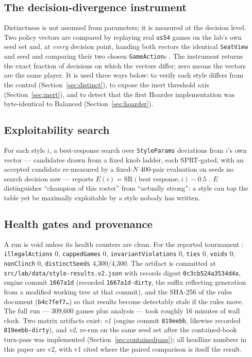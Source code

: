 \documentclass[11pt]{article}
\newcommand{\code}[1]{\texttt{#1}}
\newcommand{\usff}{\code{us54}}
\begin{document}
\subsection{The decision-divergence instrument}
\label{sec:instrument}

Distinctness is not assumed from parameters; it is measured at the decision level. Two policy
vectors are compared by replaying real \usff{} games on the lab's own seed set and, at
\emph{every} decision point, handing both vectors the identical \code{SeatView} and seed and
comparing their two chosen \code{GameAction}s \cite{styles}. The instrument returns the exact
fraction of decisions on which the vectors differ; zero means the vectors are the same player.
It is used three ways below: to verify each style differs from the control
(Section~\ref{sec:distinct}), to expose the inert threshold axis (Section~\ref{sec:inert}),
and to detect that the first Hoarder implementation was byte-identical to Balanced
(Section~\ref{sec:hoarder}).

\subsection{Exploitability search}

For each style $i$, a best-response search over \code{StyleParams} deviations from $i$'s own
vector --- candidates drawn from a fixed knob ladder, each SPRT-gated, with an accepted
candidate re-measured by a fixed-$N$ 400-pair evaluation on seeds no search decision saw ---
reports $E(i) = \mathrm{SR}(\text{best response}, i) - 0.5$ \cite{botlab,styles}. $E$
distinguishes ``champion of this roster'' from ``actually strong'': a style can top the table
yet be maximally exploitable by a style nobody has written.

\subsection{Health gates and provenance}
\label{sec:provenance}

A run is void unless its health counters are clean. For the reported tournament
\cite{artifact}: \code{illegalActions} 0, \code{cappedGames} 0, \code{invariantViolations} 0,
\code{ties} 0, \code{voids} 0, \code{nonClinch} 0, \code{distinctSeeds} 4{,}300/4{,}300. The
artifact is committed at \code{src/lab/data/style-results.v2.json} with records digest
\code{0c3cb524a3534d4a}, engine commit \code{1667a1d} (recorded \code{1667a1d-dirty}, the
suffix reflecting generation from a modified working tree at that commit), and the SHA-256 of the
rules document (\code{b4c7fef7\ldots}) so that results become detectably stale if the rules
move. The full run --- 309{,}600 games plus analysis --- took roughly 16 minutes of wall
clock. Two matrix artifacts exist: \emph{v1} (engine commit \code{819eebb}, likewise recorded
\code{819eebb-dirty}), and \emph{v2},
re-run on the same seed set after the contained-book turn-pass was implemented
(Section~\ref{sec:containedpass}); all headline numbers in this paper are v2, with v1 cited
where the paired comparison is itself the result.
\end{document}
